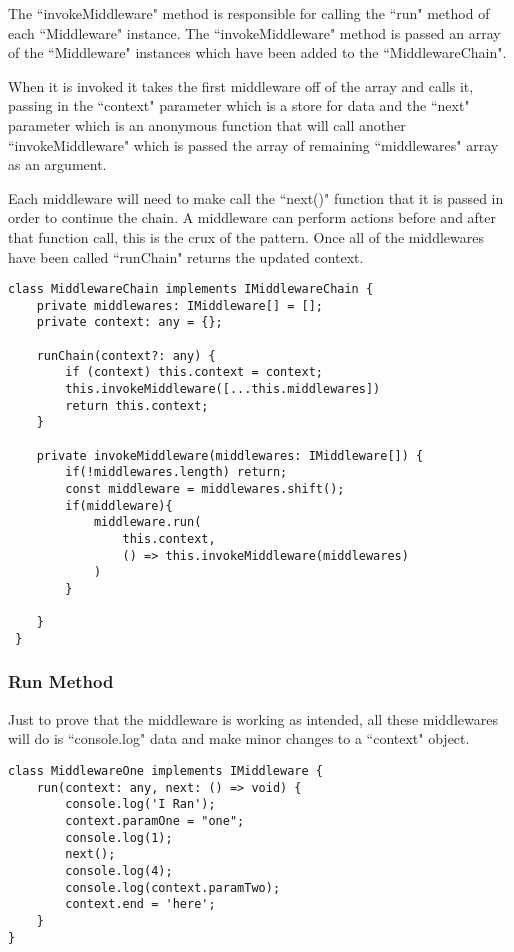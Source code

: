 \documentclass[12pt]{article}
\begin{document}
The ``invokeMiddleware" method is responsible for calling the ``run" method of each ``Middleware" instance. The ``invokeMiddleware" method is passed an array of the ``Middleware" instances which have been added to the ``MiddlewareChain". 
\par When it is invoked it takes the first middleware off of the array and calls it, passing in the ``context" parameter which is a store for data and the ``next" parameter which is an anonymous function that will call another ``invokeMiddleware" which is passed the array of remaining ``middlewares" array as an argument. 
\par Each middleware will need to make call the ``next()" function that it is passed in order to continue the chain.  A middleware can perform actions before and after that function call, this is the crux of the pattern. Once all of the middlewares have been called ``runChain" returns the updated context.

\begin{lstlisting}[caption=invokeMiddleware Method,label=code:invoke]
class MiddlewareChain implements IMiddlewareChain {
    private middlewares: IMiddleware[] = [];
    private context: any = {};
    
    runChain(context?: any) {
        if (context) this.context = context;
        this.invokeMiddleware([...this.middlewares])
        return this.context;
    }
    
    private invokeMiddleware(middlewares: IMiddleware[]) {
        if(!middlewares.length) return;
        const middleware = middlewares.shift();
        if(middleware){
            middleware.run(
                this.context, 
                () => this.invokeMiddleware(middlewares)
            )
        }

    }
 }
\end{lstlisting}

\subsubsection{Run Method}

Just to prove that the middleware is working as intended, all these middlewares will do is ``console.log" data and make minor changes to a ``context" object.

\begin{lstlisting}[caption=Full Script,label=code:mwone]
class MiddlewareOne implements IMiddleware {
    run(context: any, next: () => void) {
        console.log('I Ran');
        context.paramOne = "one";
        console.log(1);
        next();
        console.log(4);
        console.log(context.paramTwo);
        context.end = 'here';
    }
}
\end{lstlisting}
\end{document}
